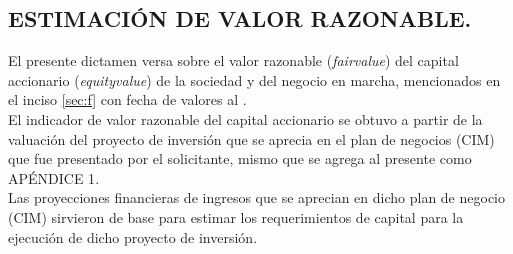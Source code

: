 \subsection{ESTIMACI\'ON DE VALOR RAZONABLE.}

 El presente dictamen versa sobre el valor razonable (\textit{\gls{fairvalue}}) del capital accionario (\textit{\gls{equityvalue}}) de la sociedad \textcolor{principal}{\empresaSolicitante} y del negocio en marcha, mencionados en el inciso \autoref{sec:f} con fecha de valores al \textcolor{principal}{\fechaValores}.\\[10pt]

El indicador de valor razonable del capital accionario se obtuvo a partir de la valuaci\'on del proyecto de inversi\'on que se aprecia en el plan de negocios (CIM) que fue presentado por el solicitante, mismo que se agrega al presente como \textcolor{secundario}{AP\'ENDICE 1}.\\ 

Las proyecciones financieras de ingresos que se aprecian en dicho plan de negocio (CIM) sirvieron de base para estimar los requerimientos de  capital para la ejecuci\'on de dicho proyecto de inversi\'on.
